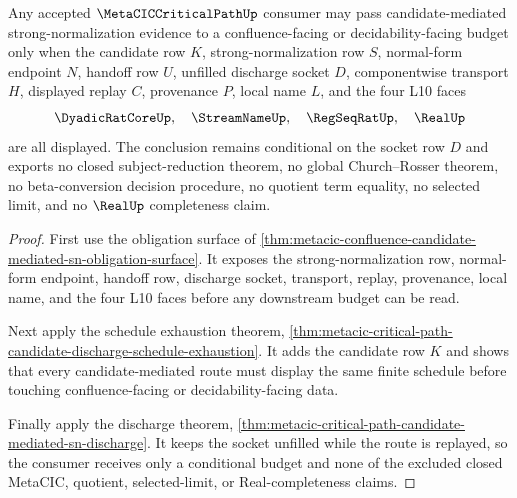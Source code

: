 \begin{theorem}
\label{thm:metacic-critical-path-candidate-mediated-sn-conditional-budget}
Any accepted $\MetaCICCriticalPathUp$ consumer may pass candidate-mediated strong-normalization evidence to a confluence-facing or decidability-facing budget only when the candidate row $K$, strong-normalization row $S$, normal-form endpoint $N$, handoff row $U$, unfilled discharge socket $D$, componentwise transport $H$, displayed replay $C$, provenance $P$, local name $L$, and the four L10 faces
$$
\DyadicRatCoreUp,\quad \StreamNameUp,\quad \RegSeqRatUp,\quad \RealUp
$$
are all displayed. The conclusion remains conditional on the socket row $D$ and exports no closed subject-reduction theorem, no global Church--Rosser theorem, no beta-conversion decision procedure, no quotient term equality, no selected limit, and no $\RealUp$ completeness claim.
\end{theorem}
\begin{proof}
First use the obligation surface of \autoref{thm:metacic-confluence-candidate-mediated-sn-obligation-surface}. It exposes the strong-normalization row, normal-form endpoint, handoff row, discharge socket, transport, replay, provenance, local name, and the four L10 faces before any downstream budget can be read.

Next apply the schedule exhaustion theorem, \autoref{thm:metacic-critical-path-candidate-discharge-schedule-exhaustion}. It adds the candidate row $K$ and shows that every candidate-mediated route must display the same finite schedule before touching confluence-facing or decidability-facing data.

Finally apply the discharge theorem, \autoref{thm:metacic-critical-path-candidate-mediated-sn-discharge}. It keeps the socket unfilled while the route is replayed, so the consumer receives only a conditional budget and none of the excluded closed MetaCIC, quotient, selected-limit, or Real-completeness claims.
\end{proof}

